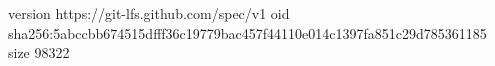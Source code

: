 version https://git-lfs.github.com/spec/v1
oid sha256:5abccbb674515dfff36c19779bac457f44110e014c1397fa851c29d785361185
size 98322
